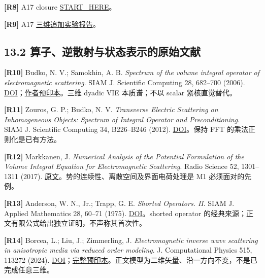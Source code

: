 \documentclass[11pt,a4paper]{article}
\begin{document}
\textbf{{[}R8{]}} A17 closure
\href{https://github.com/migodam/a17-maxwell-certified-exchange/blob/2ac81b989a2f13d62df9d5a7abd690a33c2189c7/closure_final/START_HERE.md}{START\_HERE}。

\textbf{{[}R9{]}} A17
\href{https://github.com/migodam/a17-maxwell-certified-exchange/blob/2ac81b989a2f13d62df9d5a7abd690a33c2189c7/additional_3d_examples_20261030/RESEARCH_REPORT_ZH.md}{三维追加实验报告}。

\hypertarget{ux7b97ux5b50ux9006ux6563ux5c04ux4e0eux72b6ux6001ux8868ux793aux7684ux539fux59cbux6587ux732e}{%
\subsection{13.2
算子、逆散射与状态表示的原始文献}\label{ux7b97ux5b50ux9006ux6563ux5c04ux4e0eux72b6ux6001ux8868ux793aux7684ux539fux59cbux6587ux732e}}

\textbf{{[}R10{]}} Budko, N. V.; Samokhin, A. B. \emph{Spectrum of the
volume integral operator of electromagnetic scattering}. SIAM J.
Scientific Computing 28, 682--700 (2006).
\href{https://doi.org/10.1137/050630660}{DOI}；\href{https://arxiv.org/abs/math-ph/0505013}{作者预印本}。三维
dyadic VIE 本质谱；不以 scalar 紧核直觉替代。

\textbf{{[}R11{]}} Zouros, G. P.; Budko, N. V. \emph{Transverse Electric
Scattering on Inhomogeneous Objects: Spectrum of Integral Operator and
Preconditioning}. SIAM J. Scientific Computing 34, B226--B246 (2012).
\href{https://doi.org/10.1137/110831568}{DOI}。保持 FFT
的乘法正则化是已有方法。

\textbf{{[}R12{]}} Markkanen, J. \emph{Numerical Analysis of the
Potential Formulation of the Volume Integral Equation for
Electromagnetic Scattering}. Radio Science 52, 1301--1311 (2017).
\href{https://agupubs.onlinelibrary.wiley.com/doi/10.1002/2017RS006384}{原文}。势的连续性、离散空间及界面电荷处理是
M1 必须面对的先例。

\textbf{{[}R13{]}} Anderson, W. N., Jr.; Trapp, G. E. \emph{Shorted
Operators. II}. SIAM J. Applied Mathematics 28, 60--71 (1975).
\href{https://doi.org/10.1137/0128007}{DOI}。shorted operator
的经典来源；正文有限公式给出独立证明，不声称其首次性。

\textbf{{[}R14{]}} Borcea, L.; Liu, J.; Zimmerling, J.
\emph{Electromagnetic inverse wave scattering in anisotropic media via
reduced order modeling}. J. Computational Physics 515, 113272 (2024).
\href{https://doi.org/10.1016/j.jcp.2024.113272}{DOI}；\href{https://arxiv.org/html/2403.03844v1}{完整预印本}。正文模型为二维矢量、沿一方向不变，不是已完成任意三维。
\end{document}
